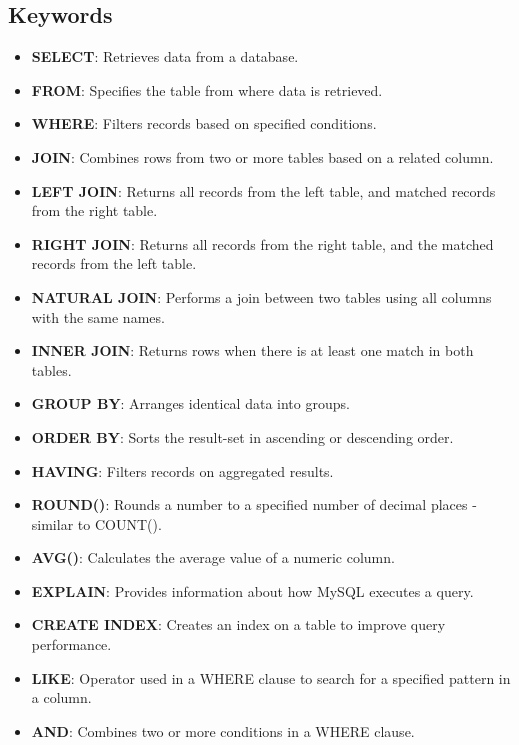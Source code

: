 \vspace{-0.3cm}
\subsection*{Keywords}
\vspace{-0.1cm}

\begin{itemize}[noitemsep,leftmargin=*]
    \leftskip-\dimexpr\leftmargin %
    \item[]{\textbf{SELECT}: Retrieves data from a database.}
    \item[]{\textbf{FROM}: Specifies the table from where data is retrieved.}
    \item[]{\textbf{WHERE}: Filters records based on specified conditions.}
    \item[]{\textbf{JOIN}: Combines rows from two or more tables based on a related column.}
    \item[]{\textbf{LEFT JOIN}: Returns all records from the left table, and matched records from the right table.}
    \item[]{\textbf{RIGHT JOIN}: Returns all records from the right table, and the matched records from the left table.}
    \item[]{\textbf{NATURAL JOIN}: Performs a join between two tables using all columns with the same names.}
    \item[]{\textbf{INNER JOIN}: Returns rows when there is at least one match in both tables.}
    \item[]{\textbf{GROUP BY}: Arranges identical data into groups.}
    \item[]{\textbf{ORDER BY}: Sorts the result-set in ascending or descending order.}
    \item[]{\textbf{HAVING}: Filters records on aggregated results.}
    \item[]{\textbf{ROUND()}: Rounds a number to a specified number of decimal places - similar to COUNT().}
    \item[]{\textbf{AVG()}: Calculates the average value of a numeric column.}
    \item[]{\textbf{EXPLAIN}: Provides information about how MySQL executes a query.}
    \item[]{\textbf{CREATE INDEX}: Creates an index on a table to improve query performance.}
    \item[]{\textbf{LIKE}: Operator used in a WHERE clause to search for a specified pattern in a column.}
    \item[]{\textbf{AND}: Combines two or more conditions in a WHERE clause.}

\end{itemize}
